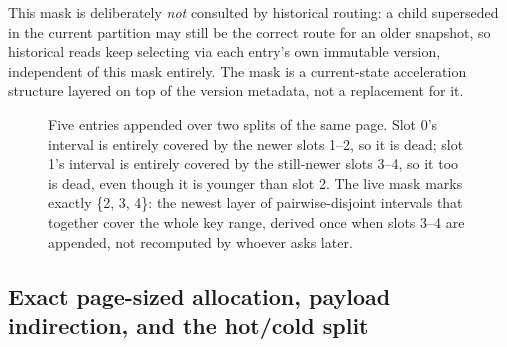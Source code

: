 \documentclass[11pt]{article}
\begin{document}
This mask is deliberately \emph{not} consulted by historical routing: a child
superseded in the current partition may still be the correct route for an older
snapshot, so historical reads keep selecting via each entry's own immutable version,
independent of this mask entirely. The mask is a current-state acceleration
structure layered on top of the version metadata, not a replacement for it.

\begin{figure}[h]
\centering
{}
\caption{Five entries appended over two splits of the same page. Slot 0's interval
  is entirely covered by the newer slots 1--2, so it is dead; slot 1's interval is
  entirely covered by the still-newer slots 3--4, so it too is dead, even though it
  is younger than slot 2. The live mask marks exactly \{2, 3, 4\}: the newest layer
  of pairwise-disjoint intervals that together cover the whole key range, derived
  once when slots 3--4 are appended, not recomputed by whoever asks later.}
\label{fig:internal-live-mask}
\end{figure}

\subsection{Exact page-sized allocation, payload indirection, and the hot/cold split}
\end{document}
